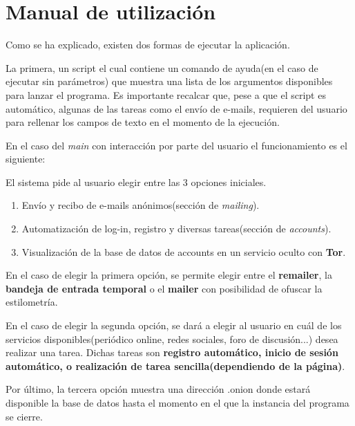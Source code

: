 \chapter{Manual de utilización}
\label{Anexo:manualuso}

Como se ha explicado, existen dos formas de ejecutar la aplicación. 

La primera, un script el cual contiene un comando de ayuda(en el caso de ejecutar sin parámetros) que muestra una lista de los argumentos disponibles para lanzar el programa. Es importante recalcar que, pese a que el script es automático, algunas de las tareas como el envío de e-mails, requieren del usuario para rellenar los campos de texto en el momento de la ejecución.

En el caso del \textit{main} con interacción por parte del usuario el funcionamiento es el siguiente:

El sistema pide al usuario elegir entre las 3 opciones iniciales.
\begin{enumerate}
	\item {Envío y recibo de e-mails anónimos(sección de \textit{mailing}).}
	
	\item {Automatización de log-in, registro y diversas tareas(sección de \textit{accounts})}.
	
	\item {Visualización de la base de datos de accounts en un servicio oculto con \textbf{Tor}}.
\end{enumerate}

En el caso de elegir la primera opción, se permite elegir entre el \textbf{remailer}, la \textbf{bandeja de entrada temporal} o el \textbf{mailer} con posibilidad de ofuscar la estilometría.

En el caso de elegir la segunda opción, se dará a elegir al usuario en cuál de los servicios disponibles(periódico online, redes sociales, foro de discusión...) desea realizar una tarea. Dichas tareas son \textbf{registro automático, inicio de sesión automático, o realización de tarea sencilla(dependiendo de la página)}.

Por último, la tercera opción muestra una dirección .onion donde estará disponible la base de datos hasta el momento en el que la instancia del programa se cierre.

\newpage \thispagestyle{empty} %